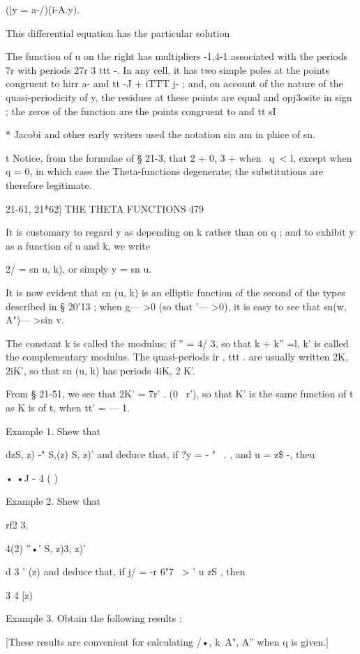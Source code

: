 (|y = a-/)(i-A.y).

This differential equation has the particular solution

The function of u on the right has multipliers -1,4-1 associated with
the periods 7r%
with periods 27r 3 ttt -. In any cell, it has two simple poles at the
points congruent to hirr a- and tt -J + iTTT j- ; and, on account of
the nature of the quasi-periodicity of y, the residues at these points
are equal and opj3osite in sign ; the zeros of the function are the
points congruent to and tt sI

* Jacobi and other early writers used the notation sin am in phice of
sn.

t Notice, from the formulae of § 21-3, that 2 + 0, 3 + when \ q\ < l,
except when q = 0, in which case the Theta-functions degenerate; the
substitutions are therefore legitimate.

21-61, 21*62] THE THETA FUNCTIONS 479

It is customary to regard y as depending on k rather than on q ; and
to exhibit y as a function of u and k, we write

2/ = sn u, k), or simply y = sn u.

It is now evident that sn (u, k) is an elliptic function of the second
of the types described in § 20'13 ; when g— >0 (so that '— >0), it is
easy to see that sn(w, A")— >sin v.

The constant k is called the modulus; if '' = 4/ 3, so that k + k''
=l, k' is called the complementary modulus. The quasi-periods ir , ttt
. are usually written 2K, 2iK', so that sn (u, k) has periods 4iK, 2
K'.

From § 21-51, we see that 2K' = 7r' . (0 \ r'), so that K' is the same
function of t as K is of t, when tt' = — 1.

Example 1. Shew that

dzS, z) -" S,(z) S, z)' and deduce that, if ?y = - " ~. , and u = z\$
-, theu

• •J - 4 ( )

Example 2. Shew that

rf2 3.

4(2) ''•' S, z)3, z)'

d 3 ' (z) and deduce that, if j/ = -r 6"7 \ > ' u zS , then

 3 4 [z)

Example 3. Obtain the following results :

[These results are convenient for calculating /•, k\ A", A'' when q is
given.]

